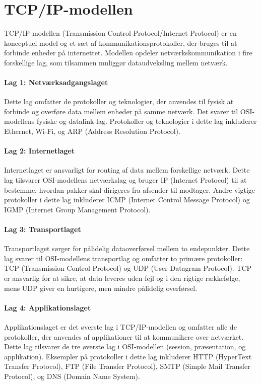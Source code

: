 \section{TCP/IP-modellen}
TCP/IP-modellen (Transmission Control Protocol/Internet Protocol) er en konceptuel model og et sæt af kommunikationsprotokoller, der bruges til at forbinde enheder på internettet. Modellen opdeler netværkskommunikation i fire forskellige lag, som tilsammen muliggør dataudveksling mellem netværk.

\paragraph{Lag 1: Netværksadgangslaget}
Dette lag omfatter de protokoller og teknologier, der anvendes til fysisk at forbinde og overføre data mellem enheder på samme netværk. Det svarer til OSI-modellens fysiske og datalink-lag. Protokoller og teknologier i dette lag inkluderer Ethernet, Wi-Fi, og ARP (Address Resolution Protocol).

\paragraph{Lag 2: Internetlaget}
Internetlaget er ansvarligt for routing af data mellem forskellige netværk. Dette lag tilsvarer OSI-modellens netværkslag og bruger IP (Internet Protocol) til at bestemme, hvordan pakker skal dirigeres fra afsender til modtager. Andre vigtige protokoller i dette lag inkluderer ICMP (Internet Control Message Protocol) og IGMP (Internet Group Management Protocol).

\paragraph{Lag 3: Transportlaget}
Transportlaget sørger for pålidelig dataoverførsel mellem to endepunkter. Dette lag svarer til OSI-modellens transportlag og omfatter to primære protokoller: TCP (Transmission Control Protocol) og UDP (User Datagram Protocol). TCP er ansvarlig for at sikre, at data leveres uden fejl og i den rigtige rækkefølge, mens UDP giver en hurtigere, men mindre pålidelig overførsel.

\paragraph{Lag 4: Applikationslaget}
Applikationslaget er det øverste lag i TCP/IP-modellen og omfatter alle de protokoller, der anvendes af applikationer til at kommunikere over netværket. Dette lag tilsvarer de tre øverste lag i OSI-modellen (session, præsentation, og applikation). Eksempler på protokoller i dette lag inkluderer HTTP (HyperText Transfer Protocol), FTP (File Transfer Protocol), SMTP (Simple Mail Transfer Protocol), og DNS (Domain Name System).

